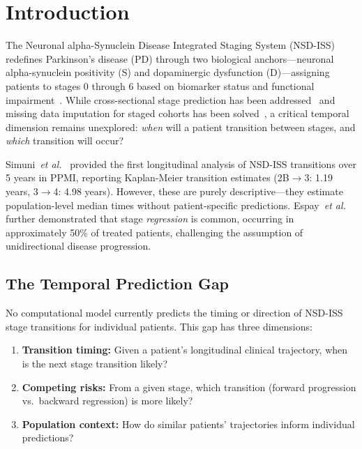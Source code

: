 \section{Introduction}
\label{p3:sec:introduction}

The Neuronal alpha-Synuclein Disease Integrated Staging System (NSD-ISS) redefines Parkinson's disease (PD) through two biological anchors---neuronal alpha-synuclein positivity (S) and dopaminergic dysfunction (D)---assigning patients to stages 0 through 6 based on biomarker status and functional impairment~\cite{simuni2024}. While cross-sectional stage prediction has been addressed~\cite{paper1} and missing data imputation for staged cohorts has been solved~\cite{paper2}, a critical temporal dimension remains unexplored: \textit{when} will a patient transition between stages, and \textit{which} transition will occur?

Simuni~\textit{et al.}~\cite{simuni2025} provided the first longitudinal analysis of NSD-ISS transitions over 5 years in PPMI, reporting Kaplan-Meier transition estimates (2B$\to$3: 1.19 years, 3$\to$4: 4.98 years). However, these are purely descriptive---they estimate population-level median times without patient-specific predictions. Espay~\textit{et al.}~\cite{espay2025} further demonstrated that stage \textit{regression} is common, occurring in approximately 50\% of treated patients, challenging the assumption of unidirectional disease progression.

\subsection{The Temporal Prediction Gap}

No computational model currently predicts the timing or direction of NSD-ISS stage transitions for individual patients. This gap has three dimensions:
\begin{enumerate}
    \item \textbf{Transition timing:} Given a patient's longitudinal clinical trajectory, when is the next stage transition likely?
    \item \textbf{Competing risks:} From a given stage, which transition (forward progression vs.\ backward regression) is more likely?
    \item \textbf{Population context:} How do similar patients' trajectories inform individual predictions?
\end{enumerate}


